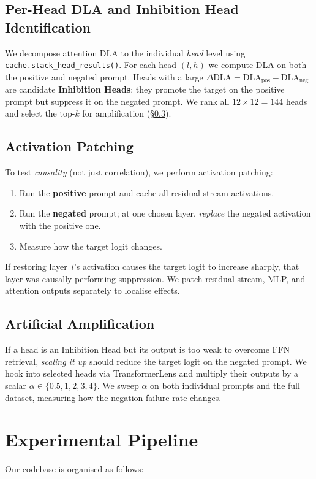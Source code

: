 \documentclass[11pt]{article}
\begin{document}
\subsection{Per-Head DLA and Inhibition Head Identification}
We decompose attention DLA to the individual \emph{head} level using
\verb|cache.stack_head_results()|.  For each head $(l,h)$ we compute
DLA on both the positive and negated prompt.  Heads with a large
$\Delta\mathrm{DLA} = \mathrm{DLA}_{\mathrm{pos}} - \mathrm{DLA}_{\mathrm{neg}}$
are candidate \textbf{Inhibition Heads}: they promote the target on the
positive prompt but suppress it on the negated prompt.  We rank all
$12 \times 12 = 144$ heads and select the top-$k$ for amplification
(\S\ref{sec:amp}).

\subsection{Activation Patching}
\label{sec:patching}
To test \emph{causality} (not just correlation), we perform activation
patching:
\begin{enumerate}
\item Run the \textbf{positive} prompt and cache all residual-stream
      activations.
\item Run the \textbf{negated} prompt; at one chosen layer, \emph{replace}
      the negated activation with the positive one.
\item Measure how the target logit changes.
\end{enumerate}
If restoring layer~$l$'s activation causes the target logit to increase
sharply, that layer was causally performing suppression.  We patch
residual-stream, MLP, and attention outputs separately to localise effects.

\subsection{Artificial Amplification}
\label{sec:amp}
If a head is an Inhibition Head but its output is too weak to overcome FFN
retrieval, \emph{scaling it up} should reduce the target logit on the
negated prompt.  We hook into selected heads via TransformerLens and
multiply their outputs by a scalar $\alpha \in \{0.5, 1, 2, 3, 4\}$.
We sweep $\alpha$ on both individual prompts and the full dataset, measuring
how the negation failure rate changes.

\section{Experimental Pipeline}
\label{sec:pipeline}
Our codebase is organised as follows:
\end{document}
